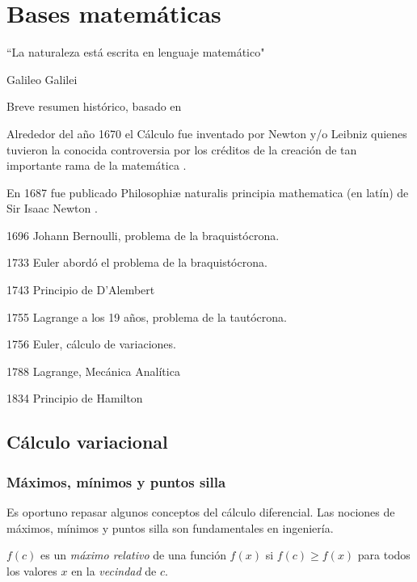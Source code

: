 \setchapterpreamble[u]{\margintoc}

\chapter{Bases matemáticas} \label{chap:mate}

\begin{kaobox}
	``La naturaleza está escrita en lenguaje matemático"
	\begin{flushright}
		Galileo Galilei
	\end{flushright}
\end{kaobox}

Breve resumen histórico, basado en \cite{GoodVibrations01}

Alrededor del año 1670 el Cálculo fue inventado por Newton y/o Leibniz quienes tuvieron
la conocida controversia por los créditos de la creación de tan importante rama de la
matemática \cite{guicciardini2003reading}.

En 1687 fue publicado Philosophiæ naturalis principia mathematica (en latín) de Sir Isaac Newton \cite{newton1987}.

1696 Johann Bernoulli, problema de la braquistócrona.

1733 Euler abordó el problema de la braquistócrona.

1743 Principio de D'Alembert

1755 Lagrange a los 19 años, problema de la tautócrona.

1756 Euler, cálculo de variaciones.

1788 Lagrange, Mecánica Analítica

1834 Principio de Hamilton

\section{Cálculo variacional}

\subsection{Máximos, mínimos y puntos silla}

Es oportuno repasar algunos conceptos del cálculo diferencial. Las nociones de máximos,
mínimos y puntos silla son fundamentales en ingeniería.

$f(c)$ es un \textit{máximo relativo} de una función $f(x)$ si $f(c) \ge f(x)$ para 
todos los valores $x$ en la \textit{vecindad} de $c$.


